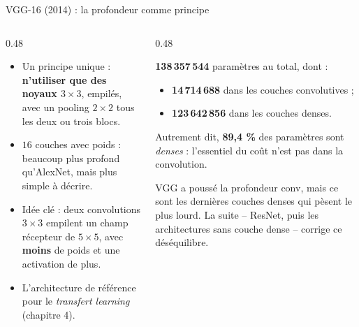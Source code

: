 \begin{frame}{VGG-16 (2014) : la profondeur comme principe}
\begin{columns}[t]
\begin{column}{0.48\textwidth}
\begin{itemize}
  \item Un principe unique : \textbf{n'utiliser que des noyaux $3\times3$},
  empilés, avec un pooling $2\times2$ tous les deux ou trois blocs.
  \item $16$ couches avec poids : beaucoup plus profond qu'AlexNet,
  mais plus simple à décrire.
  \item Idée clé : deux convolutions $3\times3$ empilent un champ
  récepteur de $5\times5$, avec \textbf{moins} de poids et une activation
  de plus.
  \item L'architecture de référence pour le \emph{transfert learning}
  (chapitre 4).
\end{itemize}
\end{column}
\begin{column}{0.48\textwidth}
\begin{wbox}
\textbf{138\,357\,544} paramètres au total, dont :
\begin{itemize}
  \item \textbf{14\,714\,688} dans les couches convolutives ;
  \item \textbf{123\,642\,856} dans les couches denses.
\end{itemize}
Autrement dit, \textbf{89{,}4 \%} des paramètres sont \emph{denses} :
l'essentiel du coût n'est pas dans la convolution.
\end{wbox}
\begin{kbox}
VGG a poussé la profondeur conv, mais ce sont les dernières couches denses
qui pèsent le plus lourd. La suite -- ResNet, puis les architectures sans
couche dense -- corrige ce déséquilibre.
\end{kbox}
\end{column}
\end{columns}
\end{frame}

